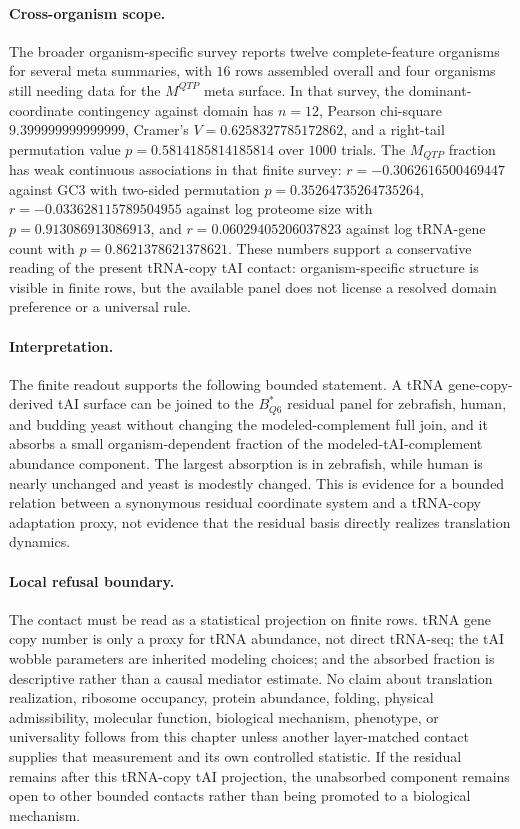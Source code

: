 \paragraph{Cross-organism scope.}
The broader organism-specific survey reports twelve complete-feature organisms for several meta summaries, with $16$ rows assembled overall and four organisms still needing data for the $M^{QTP}$ meta surface.  In that survey, the dominant-coordinate contingency against domain has $n=12$, Pearson chi-square $9.399999999999999$, Cramer's $V=0.6258327785172862$, and a right-tail permutation value $p=0.5814185814185814$ over $1000$ trials.  The $M_{QTP}$ fraction has weak continuous associations in that finite survey: $r=-0.3062616500469447$ against GC3 with two-sided permutation $p=0.35264735264735264$, $r=-0.033628115789504955$ against log proteome size with $p=0.913086913086913$, and $r=0.06029405206037823$ against log tRNA-gene count with $p=0.8621378621378621$.  These numbers support a conservative reading of the present tRNA-copy tAI contact: organism-specific structure is visible in finite rows, but the available panel does not license a resolved domain preference or a universal rule.

\paragraph{Interpretation.}
The finite readout supports the following bounded statement.  A tRNA gene-copy-derived tAI surface can be joined to the $B^*_{Q6}$ residual panel for zebrafish, human, and budding yeast without changing the modeled-complement full join, and it absorbs a small organism-dependent fraction of the modeled-tAI-complement abundance component.  The largest absorption is in zebrafish, while human is nearly unchanged and yeast is modestly changed.  This is evidence for a bounded relation between a synonymous residual coordinate system and a tRNA-copy adaptation proxy, not evidence that the residual basis directly realizes translation dynamics.

\paragraph{Local refusal boundary.}
The contact must be read as a statistical projection on finite rows.  tRNA gene copy number is only a proxy for tRNA abundance, not direct tRNA-seq; the tAI wobble parameters are inherited modeling choices; and the absorbed fraction is descriptive rather than a causal mediator estimate.  No claim about translation realization, ribosome occupancy, protein abundance, folding, physical admissibility, molecular function, biological mechanism, phenotype, or universality follows from this chapter unless another layer-matched contact supplies that measurement and its own controlled statistic.  If the residual remains after this tRNA-copy tAI projection, the unabsorbed component remains open to other bounded contacts rather than being promoted to a biological mechanism.